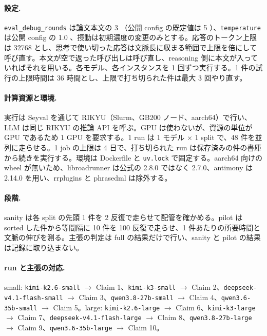 \documentclass{article}
\begin{document}
\paragraph{設定.}
\texttt{eval\_debug\_rounds} は論文本文の 3 \cite[s1.p4]{duan-2025-measuring}（公開 config の既定値は 5 \cite[s2.p3]{h4duan-2025-scigym}）、\texttt{temperature} は公開 config の 1.0 \cite[s2.p1]{h4duan-2025-scigym}、摂動は初期濃度の変更のみとする。応答のトークン上限は 32768 とし、思考で使い切った応答は文脈長に収まる範囲で上限を倍にして呼び直す。本文が空で返った呼び出しは呼び直し、reasoning 側に本文が入っていればそれを用いる。各モデル、各インスタンスを 1 回ずつ実行する。1 件の試行の上限時間は 36 時間とし、上限で打ち切られた件は最大 3 回やり直す。

\paragraph{計算資源と環境.}
実行は Seyval を通じて RIKYU（Slurm、GB200 ノード、aarch64）で行い、LLM は同じ RIKYU の推論 API を呼ぶ。GPU は使わないが、資源の単位が GPU であるため 1 GPU を要求する。1 run は 1 モデル × 1 split で、48 件を並列に走らせる。1 job の上限は 4 日で、打ち切られた run は保存済みの件の書庫から続きを実行する。環境は Dockerfile と \texttt{uv.lock} で固定する。aarch64 向けの wheel が無いため、libroadrunner は公式の 2.8.0 ではなく 2.7.0、antimony は 2.14.0 を用い、rrplugins と phrasedml は除外する。

\paragraph{段階.}
sanity は各 split の先頭 1 件を 2 反復で走らせて配管を確かめる。pilot は sorted した件から等間隔に 10 件を 100 反復で走らせ、1 件あたりの所要時間と文脈の伸びを測る。主張の判定は full の結果だけで行い、sanity と pilot の結果は記録に取り込まない。

\paragraph{run と主張の対応.}
small: \texttt{kimi-k2.6-small} $\to$ Claim 1、\texttt{kimi-k3-small} $\to$ Claim 2、\texttt{deepseek-v4.1-flash-small} $\to$ Claim 3、\texttt{qwen3.8-27b-small} $\to$ Claim 4、\texttt{qwen3.6-35b-small} $\to$ Claim 5。large: \texttt{kimi-k2.6-large} $\to$ Claim 6、\texttt{kimi-k3-large} $\to$ Claim 7、\texttt{deepseek-v4.1-flash-large} $\to$ Claim 8、\texttt{qwen3.8-27b-large} $\to$ Claim 9、\texttt{qwen3.6-35b-large} $\to$ Claim 10。
\end{document}
